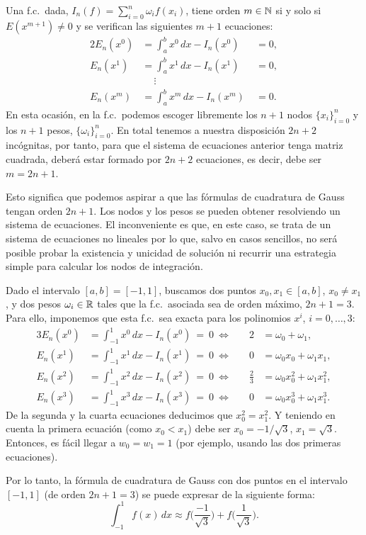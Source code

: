 Una f.c.\ dada, $I_n(f)=\sum_{i=0}^n \omega_i f(x_i)$, tiene orden
$m\in\operatorname{{\mathbb N}}$ si y solo si $E(x^{m+1})\neq 0$ y se verifican las
siguientes $m+1$ ecuaciones:
\begin{alignat*}{2}
  E_n(x^0)&=\int_a^b x^0\, dx -I_n(x^0)&\; =0, \\
  E_n(x^1)&=\int_a^b x^1\, dx -I_n(x^1)&\; =0, \\
  &~\quad\vdots \\
  E_n(x^m)&=\int_a^b x^m\, dx -I_n(x^m)&\; =0.
\end{alignat*}
En esta ocasión, en la f.c.\ podemos escoger libremente los $n+1$ nodos
$\{x_i\}_{i=0}^n$ y los $n+1$ pesos, $\{\omega_i\}_{i=0}^n$. En total
tenemos a nuestra disposición $2n+2$ incógnitas, por tanto, para que
el sistema de ecuaciones anterior tenga matriz cuadrada, deberá estar
formado por $2n+2$ ecuaciones, es decir, debe ser $m=2n+1$.

Esto significa que podemos aspirar a que las fórmulas de cuadratura de
Gauss tengan orden $2n+1$. Los nodos y los pesos se pueden obtener
resolviendo un sistema de ecuaciones. El inconveniente es que, en este
caso, se trata de un sistema de ecuaciones no lineales por lo que,
salvo en casos sencillos, no será posible probar la existencia y
unicidad de solución ni recurrir una estrategia simple para calcular
los nodos de integración.


\begin{example}
  Dado el intervalo $[a,b]=[-1,1]$, buscamos dos puntos
  $x_0,x_1\in [a,b]$, $x_0\neq x_1$, y dos pesos $\omega_i\in\operatorname{{\mathbb R}}$
  tales que la f.c.\ asociada sea de orden máximo, $2n+1=3$. Para
  ello, imponemos que esta f.c.\ sea exacta para los polinomios $x^i$,
  $i=0,\dots,3$:
  \begin{alignat*}{3}
    E_n(x^0)&=\int_{-1}^1 x^0\, dx - I_n(x^0)\ =\ 0 \ \Leftrightarrow
    \quad & 2 &= \omega_0+\omega_1,\\
    E_n(x^1)&=\int_{-1}^1 x^1\, dx - I_n(x^1)\ =\ 0 \ \Leftrightarrow
    \quad & 0 &=  \omega_0x_0+\omega_1x_1,\\
    E_n(x^2)&=\int_{-1}^1 x^2\, dx - I_n(x^2)\ =\ 0 \ \Leftrightarrow
    \quad & \frac{2}{3} &= \omega_0x_0^2+\omega_1x_1^2,\\
    E_n(x^3)&=\int_{-1}^1 x^3\, dx - I_n(x^3)\ =\ 0 \ \Leftrightarrow
    \quad &0 &=
    \omega_0x_0^3+\omega_1x_1^3.
  \end{alignat*}
  De la segunda y la cuarta ecuaciones deducimos que $x_0^2=x_1^2$.  Y
  teniendo en cuenta la primera ecuación (como $x_0<x_1$) debe ser
  $x_0=-1/{\sqrt 3}$, $x_1={\sqrt 3}$. Entonces, es fácil llegar a
  $w_0=w_1=1$ (por ejemplo, usando las dos primeras ecuaciones).

  Por lo tanto, la fórmula de cuadratura de Gauss con dos puntos en el
  intervalo $[-1,1]$ (de orden $2n+1=3$) se puede expresar de la
  siguiente forma:
  \begin{equation*}
    \int_{-1}^1 f(x)\, dx \approx f\Big( \frac{-1}{\sqrt 3} \Big)
    + f\Big(\frac{1}{\sqrt 3}\Big).
  \end{equation*}
\end{example}

